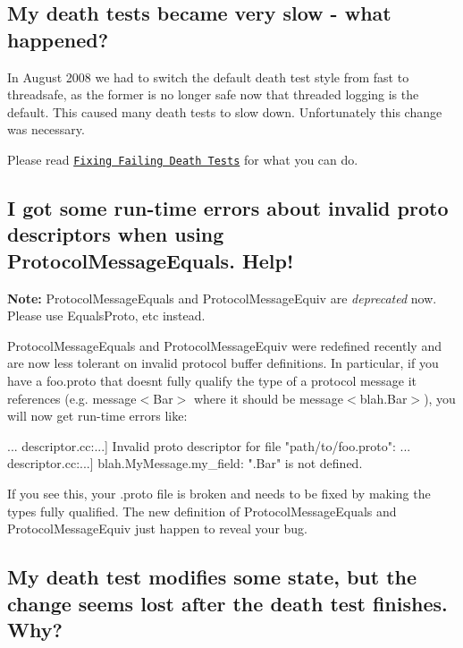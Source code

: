 \subsection*{My death tests became very slow -\/ what happened?}

In August 2008 we had to switch the default death test style from {\ttfamily fast} to {\ttfamily threadsafe}, as the former is no longer safe now that threaded logging is the default. This caused many death tests to slow down. Unfortunately this change was necessary.

Please read \href{advanced.md#death-test-styles}{\tt Fixing Failing Death Tests} for what you can do.

\subsection*{I got some run-\/time errors about invalid proto descriptors when using {\ttfamily Protocol\+Message\+Equals}. Help!}

{\bfseries Note\+:} {\ttfamily Protocol\+Message\+Equals} and {\ttfamily Protocol\+Message\+Equiv} are {\itshape deprecated} now. Please use {\ttfamily Equals\+Proto}, etc instead.

{\ttfamily Protocol\+Message\+Equals} and {\ttfamily Protocol\+Message\+Equiv} were redefined recently and are now less tolerant on invalid protocol buffer definitions. In particular, if you have a {\ttfamily foo.\+proto} that doesn\textquotesingle{}t fully qualify the type of a protocol message it references (e.\+g. {\ttfamily message$<$Bar$>$} where it should be {\ttfamily message$<$blah.\+Bar$>$}), you will now get run-\/time errors like\+:


\begin{DoxyCode}
... descriptor.cc:...] Invalid proto descriptor for file "path/to/foo.proto":
... descriptor.cc:...]  blah.MyMessage.my\_field: ".Bar" is not defined.
\end{DoxyCode}


If you see this, your {\ttfamily .proto} file is broken and needs to be fixed by making the types fully qualified. The new definition of {\ttfamily Protocol\+Message\+Equals} and {\ttfamily Protocol\+Message\+Equiv} just happen to reveal your bug.

\subsection*{My death test modifies some state, but the change seems lost after the death test finishes. Why?}

